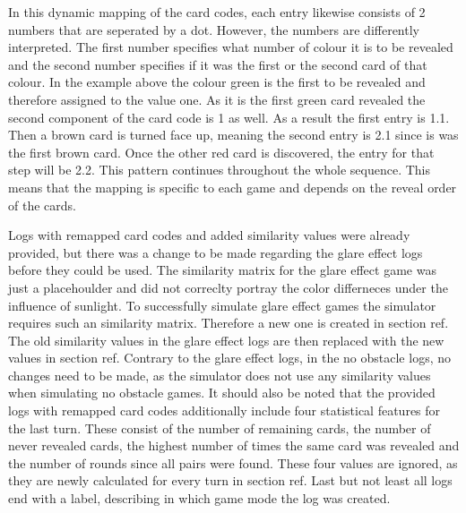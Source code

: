 In this dynamic mapping of the card codes, each entry likewise consists of 2 numbers that are seperated by a dot. However, the numbers are differently interpreted. The first number specifies what number of colour it is to be revealed and the second number specifies if it was the first or the second card of that colour. In the example above the colour green is the first to be revealed and therefore assigned to the value one. As it is the first green card revealed the second component of the card code is 1 as well. As a result the first entry is 1.1. Then a brown card is turned face up, meaning the second entry is 2.1 since is was the first brown card. Once the other red card is discovered, the entry for that step will be 2.2. This pattern continues throughout the whole sequence. This means that the mapping is specific to each game and depends on the reveal order of the cards. 

Logs with remapped card codes and added similarity values were already provided, but there was a change to be made regarding the glare effect logs before they could be used. The similarity matrix for the glare effect game was just a placehoulder and did not correclty portray the color differneces under the influence of sunlight. To successfully simulate glare effect games the simulator requires such an similarity matrix. Therefore a new one is created in section ref. The old similarity values in the glare effect logs are then replaced with the new values in section ref. Contrary to the glare effect logs, in the no obstacle logs, no changes need to be made, as the simulator does not use any similarity values when simulating no obstacle games. It should also be noted that the provided logs with remapped card codes additionally include four statistical features for the last turn. These consist of the number of remaining cards, the number of never revealed cards, the highest number of times the same card was revealed and the number of rounds since all pairs were found. These four values are ignored, as they are newly calculated for every turn in section ref. Last but not least all logs end with a label, describing in which game mode the log was created. 


